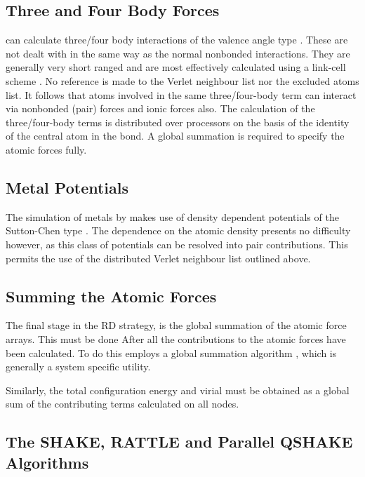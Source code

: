 \subsection{Three and Four Body Forces}

\D{} can calculate three/four body interactions of the valence
angle type \cite{vessal-90a}. These are not dealt with in the same way
as the normal nonbonded interactions. They are generally very short
ranged and are most effectively calculated using a link-cell scheme
\cite{hockney-81a}. No reference is made to the Verlet neighbour list
nor the excluded atoms list. It follows that atoms involved in the
same three/four-body term can interact via nonbonded (pair) forces and
ionic forces also. The calculation of the three/four-body terms is
distributed over processors on the basis of the identity of the
central atom in the bond. A global summation is required to specify
the atomic forces fully.

\subsection{Metal Potentials}

The simulation of metals by \D{} makes use of density dependent
potentials of the Sutton-Chen type \cite{sutton-90a}. The dependence on
the atomic density presents no difficulty however, as this class of
potentials can be resolved into pair contributions. This permits the
use of the distributed Verlet neighbour list outlined above.

\subsection{Summing the Atomic Forces}

The final stage in the RD strategy, is the global summation of the
atomic force arrays. This must be done After all the contributions to
the atomic forces have been calculated. To do this \D{} employs a
global summation algorithm \cite{smith-91a}, which is generally a
system specific utility.

Similarly, the total configuration energy and virial must be obtained as
a global sum of the contributing terms calculated on all nodes.


\subsection{The SHAKE, RATTLE and Parallel QSHAKE Algorithms}
\label{parshake}

